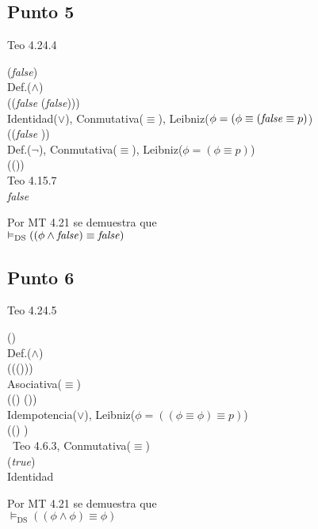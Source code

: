 \documentclass{article}
\begin{document}
\subsection{Punto 5}
\begin{logicenv}{Teo 4.24.4}
    \begin{derivation}
            (\phi \land \textrm{\textit{false}})\\
        Def.($\land$)\\
            (\phi \equiv (\textrm{\textit{false}} \equiv (\phi \lor \textrm{\textit{false}})))\\
        Identidad($\lor$), Conmutativa($\equiv$), Leibniz($\phi = (\phi \equiv (\textrm{\textit{false}} \equiv p)$)\\
            (\phi \equiv (\textrm{\textit{false}} \equiv \phi))\\
        Def.($\neg$), Conmutativa($\equiv$), Leibniz($\phi = (\phi \equiv p)$)\\
            (\phi \equiv (\neg \phi))\\
        Teo 4.15.7\\
            \textrm{\textit{false}}
    \end{derivation}
    Por MT 4.21 se demuestra que\\
    $\vDash_{\text{DS}} ((\phi \land \textrm{\textit{false}}) \equiv \textrm{\textit{false}})$
\end{logicenv}

\subsection{Punto 6}
\begin{logicenv}{Teo 4.24.5}
    \begin{derivation}
            (\phi \land \phi)\\
        Def.($\land$)\\
            (\phi \equiv (\phi \equiv (\phi \lor \phi)))\\
        Asociativa($\equiv$)\\
            ((\phi \equiv \phi) \equiv (\phi \lor \phi))\\
        Idempotencia($\lor$), Leibniz($\phi = ((\phi \equiv \phi) \equiv p)$)\\
            ((\phi \equiv \phi) \equiv \phi)\\\
        Teo 4.6.3, Conmutativa($\equiv$)\\
            (\phi \equiv \textrm{\textit{true}})\\
        Identidad\\
            \phi
    \end{derivation}
    Por MT 4.21 se demuestra que\\
    $\vDash_{\text{DS}} ((\phi \land \phi) \equiv \phi)$
\end{logicenv}
\end{document}
